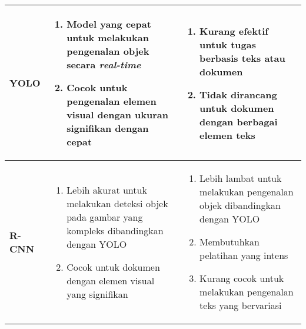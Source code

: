 \begin{table}[h!]
\begin{tabularx}{\linewidth}{|l|X|X|}
\textbf{YOLO} &
\begin{enumerate}
    \item Model yang cepat untuk melakukan pengenalan objek secara \textit{real-time}
    \item Cocok untuk pengenalan elemen visual dengan ukuran signifikan dengan cepat
\end{enumerate}
&
\begin{enumerate}
    \item Kurang efektif untuk tugas berbasis teks atau dokumen
    \item Tidak dirancang untuk dokumen dengan berbagai elemen teks
\end{enumerate}
\\ \hline

\textbf{R-CNN} &
\begin{enumerate}
    \item Lebih akurat untuk melakukan deteksi objek pada gambar yang kompleks dibandingkan dengan YOLO
    \item Cocok untuk dokumen dengan elemen visual yang signifikan
\end{enumerate}
&
\begin{enumerate}
    \item Lebih lambat untuk melakukan pengenalan objek dibandingkan dengan YOLO
    \item Membutuhkan pelatihan yang intens
    \item Kurang cocok untuk melakukan pengenalan teks yang bervariasi
\end{enumerate}
\\ \hline
\end{tabularx}
\end{table}